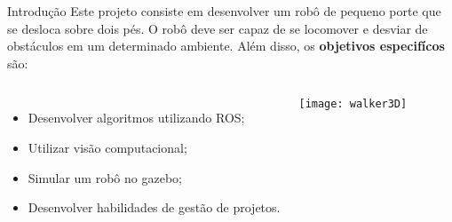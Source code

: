 \begin{frame}[c]{} 
   
    \begin{center}
    \end{center}
       
\end{frame}
%
\begin{frame}[t]{Introdução} 
    Este projeto consiste em desenvolver um robô de pequeno porte que se desloca sobre dois pés. O robô deve ser capaz de se locomover e desviar de obstáculos em um determinado ambiente. Além disso, os \textbf{objetivos especifícos} são:
   
        \begin{columns}[c]
                \begin{itemize}
                    \item Desenvolver algoritmos utilizando ROS;
                    \item Utilizar visão computacional;
                    \item Simular um robô no gazebo;
                    \item Desenvolver habilidades de gestão de projetos.
                \end{itemize}
                \texttt{[image: walker3D]}
        \end{columns}

\end{frame}

